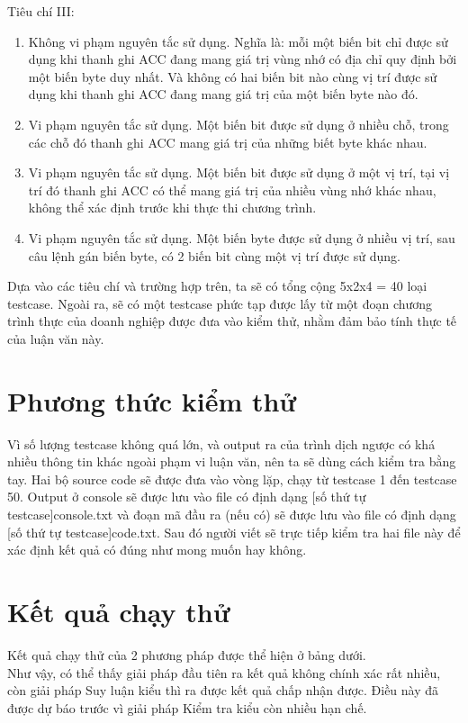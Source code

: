 Tiêu chí III:
\begin{enumerate}
	\item Không vi phạm nguyên tắc sử dụng. Nghĩa là: mỗi một biến bit chỉ được sử dụng khi thanh ghi ACC đang mang giá trị vùng nhớ có địa chỉ quy định bởi một biến byte duy nhất. Và không có hai biến bit nào cùng vị trí được sử dụng khi thanh ghi ACC đang mang giá trị của một biến byte nào đó.
	\item Vi phạm nguyên tắc sử dụng. Một biến bit được sử dụng ở nhiều chỗ, trong các chỗ đó thanh ghi ACC mang giá trị của những biết byte khác nhau.
	\item Vi phạm nguyên tắc sử dụng. Một biến bit được sử dụng ở một vị trí, tại vị trí đó thanh ghi ACC có thể mang giá trị của nhiều vùng nhớ khác nhau, không thể xác định trước khi thực thi chương trình.
	\item Vi phạm nguyên tắc sử dụng. Một biến byte được sử dụng ở nhiều vị trí, sau câu lệnh gán biến byte, có 2 biến bit cùng một vị trí được sử dụng.
\end{enumerate}

Dựa vào các tiêu chí và trường hợp trên, ta sẽ có tổng cộng 5x2x4 = 40 loại testcase. Ngoài ra, sẽ có một testcase phức tạp được lấy từ một đoạn chương trình thực của doanh nghiệp được đưa vào kiểm thử, nhằm đảm bảo tính thực tế của luận văn này.\\


\section{Phương thức kiểm thử}
Vì số lượng testcase không quá lớn, và output ra của trình dịch ngược có khá nhiều thông tin khác ngoài phạm vi luận văn, nên ta sẽ dùng cách kiểm tra bằng tay. Hai bộ source code sẽ được đưa vào vòng lặp, chạy từ testcase 1 đến testcase 50. Output ở console sẽ được lưu vào file có định dạng [số thứ tự testcase]console.txt và đoạn mã đầu ra (nếu có) sẽ được lưu vào file có định dạng [số thứ tự testcase]code.txt. Sau đó người viết sẽ trực tiếp kiểm tra hai file này để xác định kết quả có đúng như mong muốn hay không. \\


\section{Kết quả chạy thử}

Kết quả chạy thử của 2 phương pháp được thể hiện ở bảng dưới.\\


Như vậy, có thể thấy giải pháp đầu tiên ra kết quả không chính xác rất nhiều, còn giải pháp Suy luận kiểu thì ra được kết quả chấp nhận được. Điều này đã được dự báo trước vì giải pháp Kiểm tra kiểu còn nhiều hạn chế.\\
